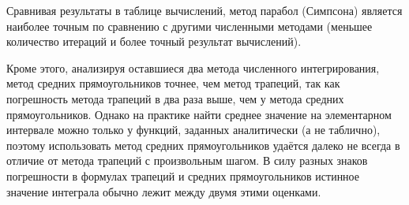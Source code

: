 \documentclass [12pt]{article}
\begin{document}
Сравнивая результаты в таблице вычислений, метод парабол (Симпсона) является наиболее точным по сравнению с другими численными методами (меньшее количество итераций и более точный результат вычислений). 

Кроме этого, анализируя оставшиеся два метода численного интегрирования, метод средних прямоугольников точнее, чем метод трапеций, так как погрешность метода трапеций в два раза выше, чем у метода средних прямоугольников. Однако на практике найти среднее значение на элементарном интервале можно только у функций, заданных аналитически (а не таблично), поэтому использовать метод средних прямоугольников удаётся далеко не всегда в отличие от метода трапеций с произвольным шагом. В силу разных знаков погрешности в формулах трапеций и средних прямоугольников истинное значение интеграла обычно лежит между двумя этими оценками.
\end{document}
